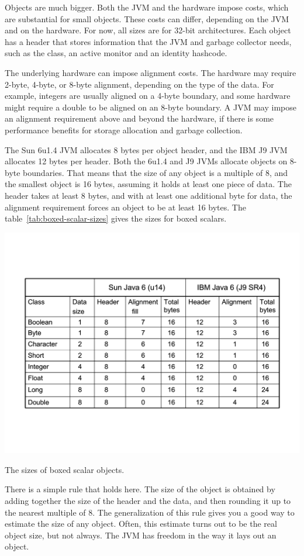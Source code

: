 \documentclass{book}
\theoremstyle{definition}
\begin{document}
Objects are much bigger. Both the JVM and the hardware impose costs, which are substantial for small objects. These costs can differ, depending on the JVM and on the hardware. For now, all sizes are for 32-bit architectures. Each object has a header that stores information that the JVM and garbage collector needs, such as the class, an active monitor and an identity hashcode. 

The underlying hardware can impose alignment costs. The hardware may require 2-byte, 4-byte, or 8-byte alignment, depending on the type of the data. For example, integers are usually aligned on a 4-byte boundary, and some hardware might require a double to be aligned on an 8-byte boundary. A JVM may impose an alignment requirement above and beyond the hardware, if there is some performance benefits for storage allocation and garbage collection.  

The Sun 6u1.4 JVM allocates 8 bytes per object header, and the IBM J9 JVM allocates 12 bytes per header. Both the 6u1.4 and J9 JVMs allocate objects on 8-byte boundaries. That means that the size of any object is a multiple of 8, and the smallest object is 16 bytes, assuming it holds at least one piece of data. The header takes at least 8 bytes, and with at least one additional byte for data, the alignment requirement forces an object to be at least 16 bytes. The table~\ref{tab:boxed-scalar-sizes} gives the sizes for boxed scalars.

\begin{table}
  \centering
 \includegraphics[width=.40\textwidth]{Figures/chapter4/boxed-scalar-sizes.pdf}
  \caption{The sizes of boxed scalar objects.}
  \label{tab:boxed-scalar-sizes}
\end{table} 

There is a simple rule that holds here. The size of the object is obtained by adding together the size of the header and the data, and then rounding it up to the nearest multiple of 8. The generalization of this rule gives you a good way to estimate the size of any object. Often, this estimate turns out to be the real object size, but not always. The JVM has freedom in the way it lays out an object. 
 
\end{document}
